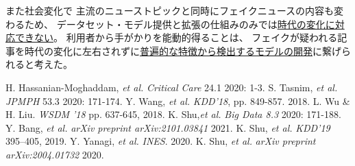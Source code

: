また社会変化で
主流のニューストピックと同時にフェイクニュースの内容も変わるため、
データセット・モデル提供と拡張の仕組みのみでは\underline{時代の変化に対応できない}。
利用者から手がかりを能動的得ることは、
フェイクが疑われる記事を時代の変化に左右されずに\underline{普遍的な特徴から検出するモデルの開発}に繋げられると考えた。


{\footnotesize 
\begin{twobibliography}{99}
    \setlength{\parskip}{0cm}
    \setlength{\itemsep}{0cm}
     H. Hassanian-Moghaddam, \textit{et al.} \textit{Critical Care} 24.1 2020: 1-3.
     S. Tasnim, \textit{et al.} \textit{JPMPH} 53.3 2020: 171-174.
     Y. Wang, \textit{et al.} \textit{KDD'18}, pp. 849-857. 2018.
     L. Wu \& H. Liu. \textit{WSDM '18}  pp. 637-645, 2018.
     K. Shu,\textit{et al.} \textit{Big Data 8.3} 2020: 171-188.
     Y. Bang, \textit{et al.} \textit{arXiv preprint arXiv:2101.03841} 2021.
     K. Shu, \textit{et al.} \textit{KDD'19} 395–405, 2019.
     Y. Yanagi, \textit{et al.} \textit{INES}. 2020.
     K. Shu, \textit{et al.}  \textit{arXiv preprint arXiv:2004.01732} 2020.
\end{twobibliography}
}


